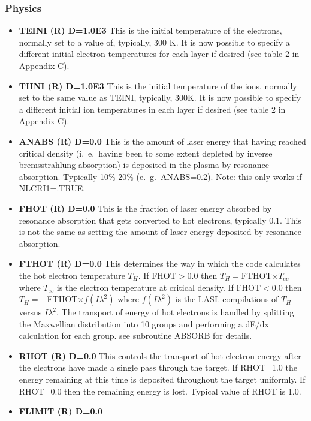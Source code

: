 \subsubsection{\bf Physics}
\begin{itemize}
\item {\bf TEINI (R) D=1.0E3}
This is the initial temperature of the electrons, normally set to
a value of, typically, 300 K.
It is now possible to specify a different initial electron temperatures for each layer if desired (see table 2 in Appendix C).
\item {\bf TIINI (R) D=1.0E3}
This is the initial temperature of the ions, normally set to
the same value as TEINI, typically, 300K.
It is now possible to specify a different initial ion temperatures in each layer if desired (see table 2 in Appendix C).
\item {\bf ANABS (R) D=0.0}
This is the amount of laser energy that having reached critical
density (i.\ e.\ having been to some extent depleted by inverse
bremsstrahlung absorption) is deposited in the plasma by
resonance absorption. Typically 10\%-20\% (e.\ g.\ ANABS=0.2).
Note: this only works if NLCRI1=.TRUE.
\item {\bf FHOT (R) D=0.0}
This is the fraction of laser energy absorbed by
resonance absorption that gets converted to hot electrons, typically
0.1. This is not the same as setting the amount of laser energy
deposited by resonance absorption.
\item {\bf FTHOT (R) D=0.0}
This determines the way in which the code calculates the
hot electron temperature $T_H$.
\newline
If FHOT$>$0.0 then $T_H=$FTHOT$\times T_{ec}$ where $T_{ec}$ is
the electron temperature at critical density. 
\newline
If FHOT$<$0.0 then
$T_H=-$FTHOT$\times f(I\lambda^2)$ where $f(I\lambda^2)$ is the
LASL compilations of $T_H$ versus $I\lambda^2$. 
\newline
The transport of energy 
of hot electrons is handled by splitting the Maxwellian distribution 
into 10 groups and performing a dE/dx calculation for each group. see subroutine ABSORB for details.
\item {\bf RHOT (R) D=0.0}
This controls the transport of hot electron energy after the electrons
have made a single pass through the target. If RHOT=1.0 the energy
remaining at this time is deposited throughout the target uniformly.
If RHOT=0.0 then the remaining energy is lost. Typical value of
RHOT is 1.0.
\item {\bf FLIMIT (R) D=0.0}

\end{itemize}

